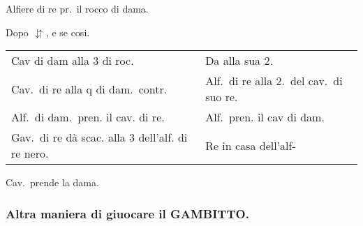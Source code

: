 \documentclass[11pt,a6paper]{article}
\newcommand{\markerD}{{\small$\downuparrows$}}
\begin{document}
Alfiere di re pr.\ il rocco di dama.

Dopo \markerD, e se cosi.

{\small\noindent\begin{tabular}{@{}p{3.84cm}p{3.84cm}}
Cav di dam alla 3 di roc. & Da alla sua 2.\\
Cav.\ di re alla q di dam.\ contr. & Alf.\ di re alla 2.\ del cav.\ di suo re.\\
Alf.\ di dam.\ pren. il cav. di re. &Alf.\ pren. il cav di dam.\\
Gav.\ di re dà scac. alla 3 dell'alf. di re nero. &Re in casa dell'alf-\\
\end{tabular}}

Cav.\ prende la dama.

\subsubsection{Altra maniera di giuocare il
GAMBITTO.}
\end{document}
